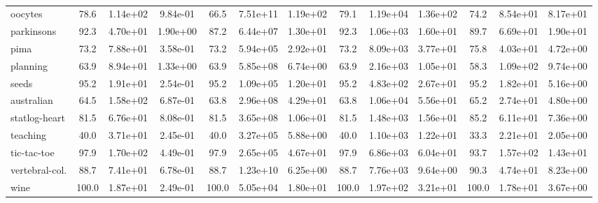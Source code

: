\begin{table}[t]
\begin{tabular}{lcccccccccccc}
			oocytes          & 78.6                        & 1.14e+02                         & 9.84e-01                           & 66.5                       & 7.51e+11 & 1.19e+02 & 79.1  & 1.19e+04 & 1.36e+02 & 74.2  & 8.54e+01 & 8.17e+01 \\
			parkinsons       & 92.3                        & 4.70e+01                         & 1.90e+00                           & 87.2                       & 6.44e+07 & 1.30e+01 & 92.3  & 1.06e+03 & 1.60e+01 & 89.7  & 6.69e+01 & 1.90e+01 \\
			pima             & 73.2                        & 7.88e+01                         & 3.58e-01                           & 73.2                       & 5.94e+05 & 2.92e+01 & 73.2  & 8.09e+03 & 3.77e+01 & 75.8  & 4.03e+01 & 4.72e+00 \\
			planning         & 63.9                        & 8.94e+01                         & 1.33e+00                           & 63.9                       & 5.85e+08 & 6.74e+00 & 63.9  & 2.16e+03 & 1.05e+01 & 58.3  & 1.09e+02 & 9.74e+00 \\
			seeds            & 95.2                        & 1.91e+01                         & 2.54e-01                           & 95.2                       & 1.09e+05 & 1.20e+01 & 95.2  & 4.83e+02 & 2.67e+01 & 95.2  & 1.82e+01 & 5.16e+00 \\
			australian       & 64.5                        & 1.58e+02                         & 6.87e-01                           & 63.8                       & 2.96e+08 & 4.29e+01 & 63.8  & 1.06e+04 & 5.56e+01 & 65.2  & 2.74e+01 & 4.80e+00 \\
			statlog-heart    & 81.5                        & 6.76e+01                         & 8.08e-01                           & 81.5                       & 3.65e+08 & 1.06e+01 & 81.5  & 1.48e+03 & 1.56e+01 & 85.2  & 6.11e+01 & 7.36e+00 \\
			teaching         & 40.0                        & 3.71e+01                         & 2.45e-01                           & 40.0                       & 3.27e+05 & 5.88e+00 & 40.0  & 1.10e+03 & 1.22e+01 & 33.3  & 2.21e+01 & 2.05e+00 \\
			tic-tac-toe      & 97.9                        & 1.70e+02                         & 4.49e-01                           & 97.9                       & 2.65e+05 & 4.67e+01 & 97.9  & 6.86e+03 & 6.04e+01 & 93.7  & 1.57e+02 & 1.43e+01 \\
			vertebral-col.   & 88.7                        & 7.41e+01                         & 6.78e-01                           & 88.7                       & 1.23e+10 & 6.25e+00 & 88.7  & 7.76e+03 & 9.64e+00 & 90.3  & 4.74e+01 & 8.23e+00 \\
			wine             & 100.0                       & 1.87e+01                         & 2.49e-01                           & 100.0                      & 5.05e+04 & 1.80e+01 & 100.0 & 1.97e+02 & 3.21e+01 & 100.0 & 1.78e+01 & 3.67e+00
		\end{tabular}
		\caption{}%
		\label{table:cone-decomp}
	\end{table}
\fi
